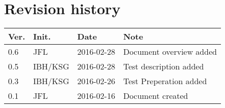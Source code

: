 \chapter*{Revision history}
\label{app:rev_his}

\renewcommand\arraystretch{1.5}
\begin{tabular}{b{1cm} b{1.5cm} b{2cm} b{8cm}}
    \textbf{Ver.} & \textbf{Init.} & \textbf{Date} & \textbf{Note} \\
    \hline
    0.6 & JFL & 2016-02-28 & Document overview added\\
    \hline
    0.5 & IBH/KSG & 2016-02-28 & Test description added \\
    \hline
    0.3 & IBH/KSG & 2016-02-26 & Test Preperation added \\
    \hline
    0.1 & JFL & 2016-02-16 & Document created \\
\end{tabular}
\renewcommand\arraystretch{1}